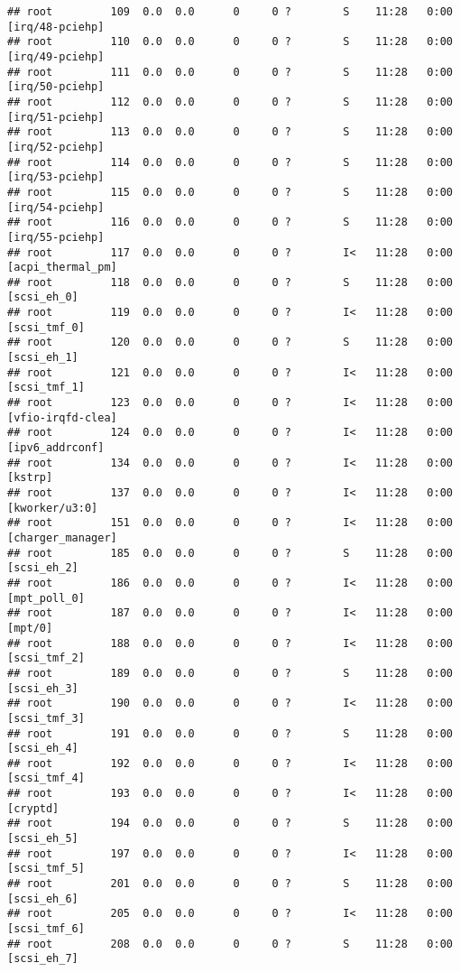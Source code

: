 \documentclass[]{article}
\begin{document}
\begin{verbatim}
## root         109  0.0  0.0      0     0 ?        S    11:28   0:00 [irq/48-pciehp]
## root         110  0.0  0.0      0     0 ?        S    11:28   0:00 [irq/49-pciehp]
## root         111  0.0  0.0      0     0 ?        S    11:28   0:00 [irq/50-pciehp]
## root         112  0.0  0.0      0     0 ?        S    11:28   0:00 [irq/51-pciehp]
## root         113  0.0  0.0      0     0 ?        S    11:28   0:00 [irq/52-pciehp]
## root         114  0.0  0.0      0     0 ?        S    11:28   0:00 [irq/53-pciehp]
## root         115  0.0  0.0      0     0 ?        S    11:28   0:00 [irq/54-pciehp]
## root         116  0.0  0.0      0     0 ?        S    11:28   0:00 [irq/55-pciehp]
## root         117  0.0  0.0      0     0 ?        I<   11:28   0:00 [acpi_thermal_pm]
## root         118  0.0  0.0      0     0 ?        S    11:28   0:00 [scsi_eh_0]
## root         119  0.0  0.0      0     0 ?        I<   11:28   0:00 [scsi_tmf_0]
## root         120  0.0  0.0      0     0 ?        S    11:28   0:00 [scsi_eh_1]
## root         121  0.0  0.0      0     0 ?        I<   11:28   0:00 [scsi_tmf_1]
## root         123  0.0  0.0      0     0 ?        I<   11:28   0:00 [vfio-irqfd-clea]
## root         124  0.0  0.0      0     0 ?        I<   11:28   0:00 [ipv6_addrconf]
## root         134  0.0  0.0      0     0 ?        I<   11:28   0:00 [kstrp]
## root         137  0.0  0.0      0     0 ?        I<   11:28   0:00 [kworker/u3:0]
## root         151  0.0  0.0      0     0 ?        I<   11:28   0:00 [charger_manager]
## root         185  0.0  0.0      0     0 ?        S    11:28   0:00 [scsi_eh_2]
## root         186  0.0  0.0      0     0 ?        I<   11:28   0:00 [mpt_poll_0]
## root         187  0.0  0.0      0     0 ?        I<   11:28   0:00 [mpt/0]
## root         188  0.0  0.0      0     0 ?        I<   11:28   0:00 [scsi_tmf_2]
## root         189  0.0  0.0      0     0 ?        S    11:28   0:00 [scsi_eh_3]
## root         190  0.0  0.0      0     0 ?        I<   11:28   0:00 [scsi_tmf_3]
## root         191  0.0  0.0      0     0 ?        S    11:28   0:00 [scsi_eh_4]
## root         192  0.0  0.0      0     0 ?        I<   11:28   0:00 [scsi_tmf_4]
## root         193  0.0  0.0      0     0 ?        I<   11:28   0:00 [cryptd]
## root         194  0.0  0.0      0     0 ?        S    11:28   0:00 [scsi_eh_5]
## root         197  0.0  0.0      0     0 ?        I<   11:28   0:00 [scsi_tmf_5]
## root         201  0.0  0.0      0     0 ?        S    11:28   0:00 [scsi_eh_6]
## root         205  0.0  0.0      0     0 ?        I<   11:28   0:00 [scsi_tmf_6]
## root         208  0.0  0.0      0     0 ?        S    11:28   0:00 [scsi_eh_7]

\end{verbatim}
\end{document}
